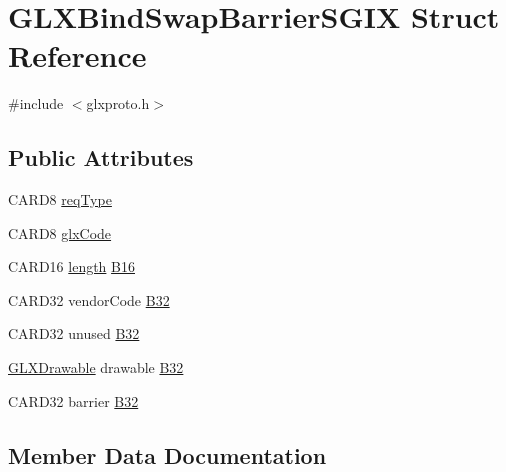 \hypertarget{struct_g_l_x_bind_swap_barrier_s_g_i_x}{}\section{G\+L\+X\+Bind\+Swap\+Barrier\+S\+G\+IX Struct Reference}
\label{struct_g_l_x_bind_swap_barrier_s_g_i_x}


{\ttfamily \#include $<$glxproto.\+h$>$}

\subsection*{Public Attributes}
\begin{DoxyCompactItemize}
\item 
C\+A\+R\+D8 \hyperlink{struct_g_l_x_bind_swap_barrier_s_g_i_x_a2bf21e21db78cd789edf2b859772b77f}{req\+Type}
\item 
C\+A\+R\+D8 \hyperlink{struct_g_l_x_bind_swap_barrier_s_g_i_x_a3a31b0fb38360a5a3f1db31d09c13508}{glx\+Code}
\item 
C\+A\+R\+D16 \hyperlink{glcorearb_8h_ab9c919755bde3b34349e23a32b4e0fa7}{length} \hyperlink{struct_g_l_x_bind_swap_barrier_s_g_i_x_ab91b3542ba9077f67c7cff859b95a7d8}{B16}
\item 
C\+A\+R\+D32 vendor\+Code \hyperlink{struct_g_l_x_bind_swap_barrier_s_g_i_x_af70d62c138d3a20277951797ac078981}{B32}
\item 
C\+A\+R\+D32 unused \hyperlink{struct_g_l_x_bind_swap_barrier_s_g_i_x_aeabb6c2c99c3379d533d749352694399}{B32}
\item 
\hyperlink{glx_8h_a826f51745d9d6c81bdbac47ae2b80cf7}{G\+L\+X\+Drawable} drawable \hyperlink{struct_g_l_x_bind_swap_barrier_s_g_i_x_a3cd0ca3b34ffe65d620c7bc27ccc3c61}{B32}
\item 
C\+A\+R\+D32 barrier \hyperlink{struct_g_l_x_bind_swap_barrier_s_g_i_x_a4f14d61540116344110d3f1a83c934e3}{B32}
\end{DoxyCompactItemize}


\subsection{Member Data Documentation}
\mbox{\label{struct_g_l_x_bind_swap_barrier_s_g_i_x_ab91b3542ba9077f67c7cff859b95a7d8}} 
